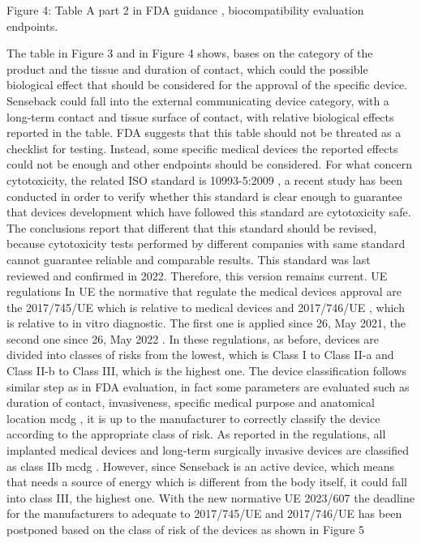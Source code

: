 \documentclass{Configuration_Files/PoliMi3i_thesis}
\begin{document}
Figure 4: Table A part 2 in FDA guidance \cite{healthUseInternationalStandard2023}, biocompatibility evaluation endpoints.

The table in Figure 3 and in Figure 4 shows, bases on the category of the product and the tissue and duration of contact, which could the possible biological effect that should be considered for the approval of the specific device.
Senseback could fall into the external communicating device category, with a long-term contact and tissue surface of contact, with relative biological effects reported in the table.  
FDA suggests that this table should not be threated as a checklist for testing. Instead, some specific medical devices the reported effects could not be enough and other endpoints should be considered.
For what concern cytotoxicity, the related ISO standard is 10993-5:2009 \cite{14:00-17:00ISO1099352009a}, a recent study \cite{gruberToxicNotToxic2023} has been conducted in order to verify whether this standard is clear enough to guarantee that devices development which have followed this standard are cytotoxicity safe. The conclusions report that different that this standard should be revised, because cytotoxicity tests performed by different companies with same standard cannot guarantee reliable and comparable results. This standard was last reviewed and confirmed in 2022. Therefore, this version remains current. 
UE regulations
In UE the normative that regulate the medical devices approval are the 2017/745/UE \cite{RegolamentoUE20172017} which is relative to medical devices and 2017/746/UE \cite{RegolamentoUE20172017a}, which is relative to in vitro diagnostic. The first one is applied since 26, May 2021, the second one since 26, May 2022 \cite{MedicalDevicesEuropean}. 
In these regulations, as before, devices are divided into classes of risks from the lowest, which is Class I to Class II-a and Class II-b to Class III, which is the highest one. The device classification follows similar step as in FDA evaluation, in fact some parameters are evaluated such as duration of contact, invasiveness, specific medical purpose and anatomical location \cite{} mcdg , it is up to the manufacturer to correctly classify the device according to the appropriate class of risk.
As reported in the regulations, all implanted medical devices and long-term surgically invasive devices are classified as class IIb \cite{}mcdg . However, since Senseback is an active device, which means that needs a source of energy which is different from the body itself, it could fall into class III, the highest one.
With the new normative UE 2023/607 \cite{RegolamentoUE20232023} the deadline for the manufacturers to adequate to 2017/745/UE and 2017/746/UE has been postponed based on the class of risk of the devices as shown in Figure 5
\end{document}
